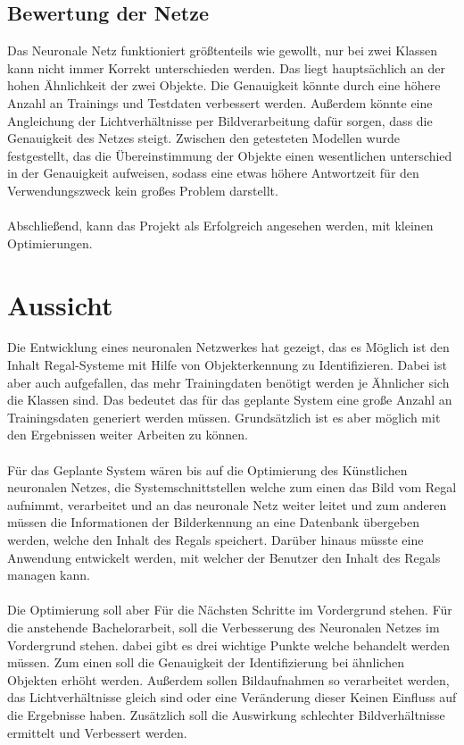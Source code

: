 \documentclass[a4paper,12pt,oneside]{article}
\begin{document}
\subsection{Bewertung der Netze}
Das Neuronale Netz funktioniert größtenteils wie gewollt, nur bei zwei Klassen kann nicht immer Korrekt unterschieden werden. Das liegt hauptsächlich an der hohen Ähnlichkeit der zwei Objekte. Die Genauigkeit könnte durch eine höhere Anzahl an Trainings und Testdaten verbessert werden. Außerdem könnte eine Angleichung der Lichtverhältnisse per Bildverarbeitung dafür sorgen, dass die Genauigkeit des Netzes steigt. Zwischen den getesteten Modellen wurde festgestellt, das die Übereinstimmung der Objekte einen wesentlichen unterschied in der Genauigkeit aufweisen, sodass eine etwas höhere Antwortzeit für den Verwendungszweck kein großes Problem darstellt.\\
\\
Abschließend, kann das Projekt als Erfolgreich angesehen werden, mit kleinen Optimierungen.

\section{Aussicht}
Die Entwicklung eines neuronalen Netzwerkes hat gezeigt, das es Möglich ist den Inhalt Regal-Systeme mit Hilfe von Objekterkennung zu Identifizieren. Dabei ist aber auch aufgefallen, das mehr Trainingdaten benötigt werden je Ähnlicher sich die Klassen sind. Das bedeutet das für das geplante System eine große Anzahl an Trainingsdaten generiert werden müssen. Grundsätzlich ist es aber möglich mit den Ergebnissen weiter Arbeiten zu können.\\
\\
Für das Geplante System wären bis auf die Optimierung des Künstlichen neuronalen Netzes, die Systemschnittstellen welche zum einen das Bild vom Regal aufnimmt, verarbeitet und an das neuronale Netz weiter leitet und zum anderen müssen die Informationen der Bilderkennung an eine Datenbank übergeben werden, welche den Inhalt des Regals speichert. Darüber hinaus müsste eine Anwendung entwickelt werden, mit welcher der Benutzer den Inhalt des Regals managen kann.\\
\\
Die Optimierung soll aber Für die Nächsten Schritte im Vordergrund stehen. Für die anstehende Bachelorarbeit, soll die Verbesserung des Neuronalen Netzes im Vordergrund stehen. dabei gibt es drei wichtige Punkte welche behandelt werden müssen. Zum einen soll die Genauigkeit der Identifizierung bei ähnlichen Objekten erhöht werden. Außerdem sollen Bildaufnahmen so verarbeitet werden, das Lichtverhältnisse gleich sind oder eine Veränderung dieser Keinen Einfluss auf die Ergebnisse haben. Zusätzlich soll die Auswirkung schlechter Bildverhältnisse ermittelt und Verbessert werden.
   
\newpage

\printbibliography
  
\end{document}
